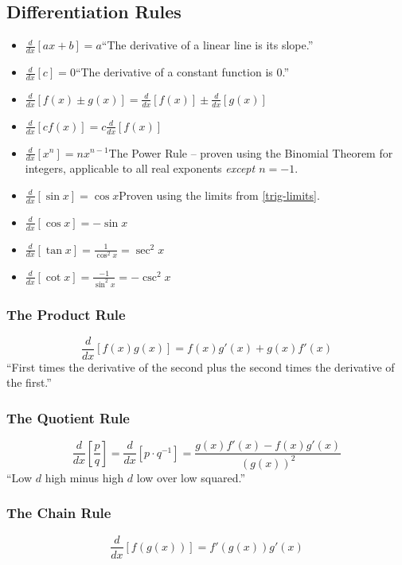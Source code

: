 \documentclass{article}
\begin{document}
\subsection{Differentiation Rules}
\begin{itemize}
    \item $\frac{d}{dx}\left[ax+b\right] = a$\quad``The derivative of a linear line is its slope.''
    \item $\frac{d}{dx}\left[c\right] = 0$\quad``The derivative of a constant function is 0.''
    \item $\frac{d}{dx}\left[f(x) \pm g(x)\right] = \frac{d}{dx}\left[f(x)\right] \pm \frac{d}{dx}\left[g(x)\right]$
    \item $\frac{d}{dx}\left[cf(x)\right] = c\frac{d}{dx}\left[f(x)\right]$
    \item $\frac{d}{dx}\left[x^n\right] = nx^{n-1}$\quad The Power Rule -- proven using the Binomial Theorem for integers, applicable to all real exponents \emph{except $n=-1$}.
    \item $\frac{d}{dx}\left[\sin{x}\right] = \cos{x}$\quad Proven using the limits from \ref{trig-limits}.
    \item $\frac{d}{dx}\left[\cos{x}\right] = -\sin{x}$
    \item $\frac{d}{dx}\left[\tan{x}\right] = \frac{1}{\cos^2{x}} = \sec^2{x}$
    \item $\frac{d}{dx}\left[\cot{x}\right] = \frac{-1}{\sin^2{x}} = -\csc^2{x}$
\end{itemize}

\subsubsection{The Product Rule}
$$\frac{d}{dx}\left[f(x)g(x)\right] = f(x)g'(x) + g(x)f'(x)$$
``First times the derivative of the second plus the second times the derivative of the first.''

\subsubsection{The Quotient Rule}
$$\frac{d}{dx}\left[\frac{p}{q}\right] = \frac{d}{dx}\left[p\cdot q^{-1}\right] = \frac{g(x)f'(x) - f(x)g'(x)}{\left(g(x)\right)^2}$$
``Low $d$ high minus high $d$ low over low squared.''

\subsubsection{The Chain Rule}\label{chain}
$$\frac{d}{dx}\left[f(g(x))\right] = f'(g(x))g'(x)$$
\end{document}
